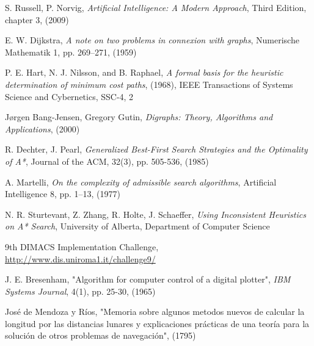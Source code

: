\documentclass[a4paper,10pt]{report}
\begin{document}
\begin{thebibliography}{99}

 S. Russell, P. Norvig, \textsl{Artificial Intelligence: A Modern Approach}, Third Edition, chapter 3, (2009)

 E. W. Dijkstra, \textsl{A note on two problems in connexion with graphs}, Numerische Mathematik 1, pp. 269–271, (1959)

 P. E. Hart, N. J. Nilsson, and B. Raphael, \textsl{A formal basis for the heuristic determination of minimum cost paths}, (1968), IEEE Transactions of Systems Science and Cybernetics, SSC-4, 2

 Jørgen Bang-Jensen, Gregory Gutin, \textsl{Digraphs: Theory, Algorithms and Applications}, (2000)

 R. Dechter, J. Pearl, \textsl{Generalized Best-First Search Strategies and the Optimality of A*}, Journal of the ACM, 32(3), pp. 505-536, (1985)

 A. Martelli, \textsl{On the complexity of admissible search algorithms}, Artificial Intelligence 8, pp. 1–13, (1977)

 N. R. Sturtevant, Z. Zhang, R. Holte, J. Schaeffer, \textsl{Using Inconsistent Heuristics on A* Search}, University of Alberta, Department of Computer Science

 9th DIMACS Implementation Challenge,\\
\url{http://www.dis.uniroma1.it/challenge9/}

 J. E. Bresenham, "Algorithm for computer control of a digital plotter", \textsl{IBM Systems Journal}, 4(1), pp. 25-30, (1965)

 José de Mendoza y Ríos, "Memoria sobre algunos metodos nuevos de calcular la longitud por las distancias lunares y explicaciones prácticas de una teoría para la solución de otros problemas de navegación", (1795)

\end{thebibliography}
\end{document}
